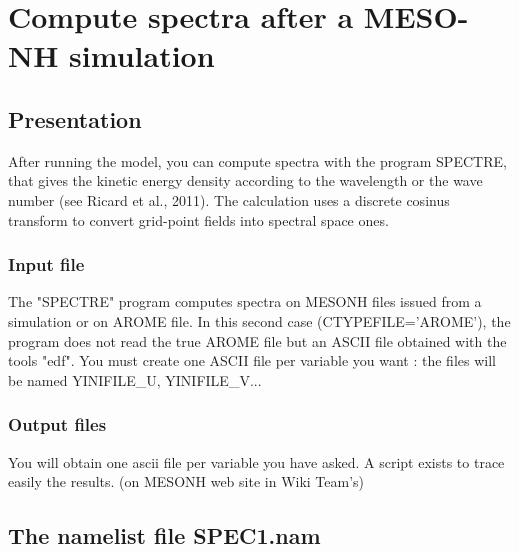 \chapter{Compute spectra after a MESO-NH simulation}\label{ch:spectre}
\section{Presentation}
After running the model, you can compute spectra with the program SPECTRE,
that gives the kinetic energy density according to the wavelength or the wave number (see Ricard et al., 2011).
The calculation uses a discrete cosinus transform 
to convert grid-point fields into spectral space ones.


\subsection{Input file}
The "SPECTRE" program computes spectra on MESONH files issued from a simulation or on AROME file. In this second case (CTYPEFILE='AROME'), the program does not read the true AROME file but an ASCII file obtained with the tools "edf". You must create one ASCII file per variable you want : the files will be named YINIFILE\_U, YINIFILE\_V...

\subsection{Output files}
You will obtain one ascii file per variable you have asked. A script exists to trace easily the results. (on MESONH web site in Wiki Team's)


\section{The namelist file SPEC1.nam}

